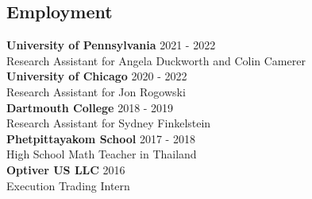 \documentclass[margin,line,pifont,palatino,courier, 9pt]{res}
\begin{document}
\begin{resume}
\section{\sc Employment}
\textbf{University of Pennsylvania} \hfill 2021 - 2022 \\
Research Assistant for Angela Duckworth and Colin Camerer \vspace{2mm}\\
\textbf{University of Chicago} \hfill 2020 - 2022\\
Research Assistant for Jon Rogowski \vspace{2mm}\\
\textbf{Dartmouth College} \hfill 2018 - 2019 \\
Research Assistant for Sydney Finkelstein \vspace{2mm}\\
\textbf{Phetpittayakom School} \hfill 2017 - 2018 \\
High School Math Teacher in Thailand \vspace{2mm}\\ 
\textbf{Optiver US LLC} \hfill 2016 \\
Execution Trading Intern

\end{resume}
\end{document}
